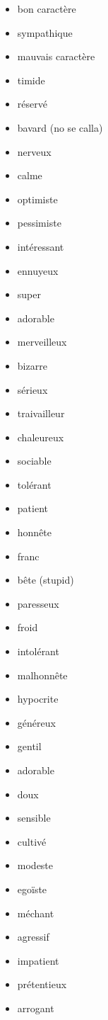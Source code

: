 \documentclass{epflnotes}
\begin{document}
\begin{multicols}{3}
\begin{itemize}
\item bon caractère
\item sympathique
\item mauvais caractère
\item timide
\item réservé
\item bavard (no se calla)
\item nerveux
\item calme
\item optimiste
\item pessimiste
\item intéressant
\item ennuyeux
\item super
\item adorable
\item merveilleux
\item bizarre
\item sérieux
\item traivailleur
\item chaleureux
\item sociable
\item tolérant
\item patient
\item honn\^ete
\item franc
\item b\^ete (stupid)
\item paresseux
\item froid
\item intolérant
\item malhonn\^ete
\item hypocrite
\item généreux
\item gentil
\item adorable
\item doux
\item sensible
\item cultivé
\item modeste
\item egoïste
\item méchant
\item agressif
\item impatient
\item prétentieux
\item arrogant
\end{itemize}
\end{multicols}
\end{document}
